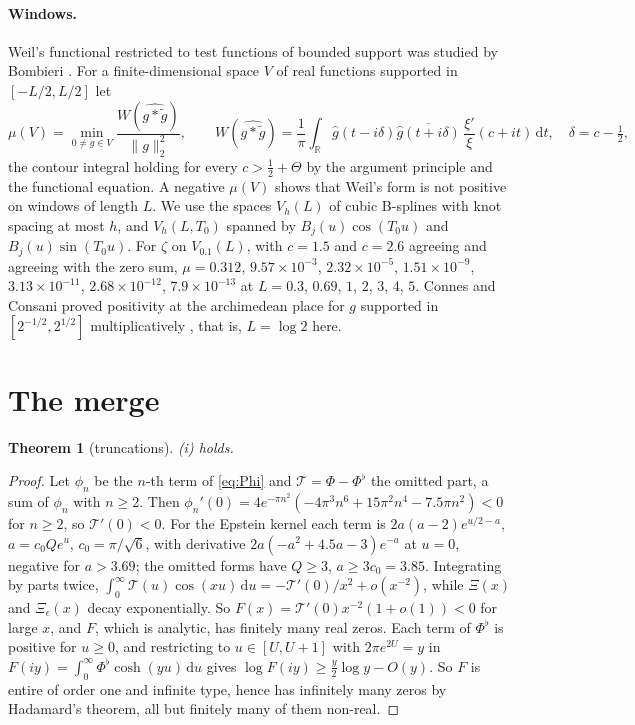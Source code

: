 \documentclass[11pt]{article}
\newtheorem{theorem}{Theorem}[section]
\theoremstyle{definition}\newtheorem{definition}[theorem]{Definition}
\theoremstyle{remark}\newtheorem{remark}[theorem]{Remark}
\newcommand{\R}{\mathbb R}\newcommand{\C}{\mathbb C}\newcommand{\N}{\mathbb N}
\newcommand{\dd}{\,\mathrm d}\newcommand{\e}{\mathrm e}
\begin{document}
\paragraph{Windows.} Weil's functional restricted to test functions of bounded support was studied by Bombieri \cite{Bombieri}. For a finite-dimensional space $V$ of real functions supported in $[-L/2,L/2]$ let
\[
\mu(V)=\min_{0\ne g\in V}\frac{W(\widehat{g*\tilde g})}{\|g\|_2^2},\qquad W(\widehat{g*\tilde g})=\frac1\pi\int_\R\widehat g(t-i\delta)\overline{\widehat g(t+i\delta)}\,\frac{\xi'}\xi(c+it)\dd t,\quad\delta=c-\tfrac12,
\]
the contour integral holding for every $c>\frac12+\Theta$ by the argument principle and the functional equation. A negative $\mu(V)$ shows that Weil's form is not positive on windows of length $L$. We use the spaces $V_h(L)$ of cubic B-splines with knot spacing at most $h$, and $V_h(L,T_0)$ spanned by $B_j(u)\cos(T_0u)$ and $B_j(u)\sin(T_0u)$. For $\zeta$ on $V_{0.1}(L)$, with $c=1.5$ and $c=2.6$ agreeing and agreeing with the zero sum, $\mu=0.312$, $9.57\times10^{-3}$, $2.32\times10^{-5}$, $1.51\times10^{-9}$, $3.13\times10^{-11}$, $2.68\times10^{-12}$, $7.9\times10^{-13}$ at $L=0.3$, $0.69$, $1$, $2$, $3$, $4$, $5$. Connes and Consani proved positivity at the archimedean place for $g$ supported in $[2^{-1/2},2^{1/2}]$ multiplicatively \cite{CC}, that is, $L=\log2$ here.

\section{The merge}\label{sec:merge}

\begin{theorem}[truncations]\label{thm:trunc}
(i) holds.
\end{theorem}
\begin{proof}
Let $\phi_n$ be the $n$-th term of \eqref{eq:Phi} and $\mathcal T=\Phi-\Phi^\flat$ the omitted part, a sum of $\phi_n$ with $n\ge2$. Then $\phi_n'(0)=4e^{-\pi n^2}(-4\pi^3n^6+15\pi^2n^4-7.5\pi n^2)<0$ for $n\ge2$, so $\mathcal T'(0)<0$. For the Epstein kernel each term is $2a(a-2)e^{u/2-a}$, $a=c_0Qe^u$, $c_0=\pi/\sqrt6$, with derivative $2a(-a^2+4.5a-3)e^{-a}$ at $u=0$, negative for $a>3.69$; the omitted forms have $Q\ge3$, $a\ge3c_0=3.85$. Integrating by parts twice, $\int_0^\infty\mathcal T(u)\cos(xu)\dd u=-\mathcal T'(0)/x^2+o(x^{-2})$, while $\Xi(x)$ and $\Xi_\epsilon(x)$ decay exponentially. So $F(x)=\mathcal T'(0)x^{-2}(1+o(1))<0$ for large $x$, and $F$, which is analytic, has finitely many real zeros. Each term of $\Phi^\flat$ is positive for $u\ge0$, and restricting to $u\in[U,U+1]$ with $2\pi e^{2U}=y$ in $F(iy)=\int_0^\infty\Phi^\flat\cosh(yu)\dd u$ gives $\log F(iy)\ge\frac y2\log y-O(y)$. So $F$ is entire of order one and infinite type, hence has infinitely many zeros by Hadamard's theorem, all but finitely many of them non-real.
\end{proof}
\end{document}
